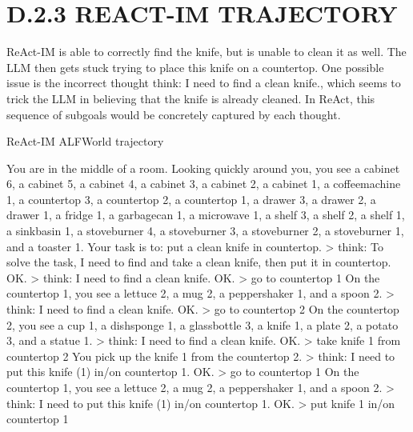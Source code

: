 \documentclass[
]{article}
\newenvironment{Shaded}{}{}
\newcommand{\NormalTok}[1]{#1}
\begin{document}
\section{D.2.3 REACT-IM TRAJECTORY}\label{d.2.3-react-im-trajectory}

ReAct-IM is able to correctly find the knife, but is unable to clean it
as well. The LLM then gets stuck trying to place this knife on a
countertop. One possible issue is the incorrect thought think: I need to
find a clean knife., which seems to trick the LLM in believing that the
knife is already cleaned. In ReAct, this sequence of subgoals would be
concretely captured by each thought.

ReAct-IM ALFWorld trajectory

\begin{Shaded}
\begin{Highlighting}[]
\NormalTok{You are in the middle of a room. Looking quickly around you, you see a cabinet 6, a cabinet 5, a cabinet 4, a cabinet 3, a cabinet 2, a cabinet 1, a coffeemachine 1, a countertop 3, a countertop 2, a countertop 1, a drawer 3, a drawer 2, a drawer 1, a fridge 1, a garbagecan 1, a microwave 1, a shelf 3, a shelf 2, a shelf 1, a sinkbasin 1, a stoveburner 4, a stoveburner 3, a stoveburner 2, a stoveburner 1, and a toaster 1.}
\NormalTok{Your task is to: put a clean knife in countertop.}
\NormalTok{\textgreater{} think: To solve the task, I need to find and take a clean knife, then put it in countertop.}
\NormalTok{OK.}
\NormalTok{\textgreater{} think: I need to find a clean knife.}
\NormalTok{OK.}
\NormalTok{\textgreater{} go to countertop 1}
\NormalTok{On the countertop 1, you see a lettuce 2, a mug 2, a peppershaker 1, and a spoon 2.}
\NormalTok{\textgreater{} think: I need to find a clean knife.}
\NormalTok{OK.}
\NormalTok{\textgreater{} go to countertop 2}
\NormalTok{On the countertop 2, you see a cup 1, a dishsponge 1, a glassbottle 3, a knife 1, a plate 2, a potato 3, and a statue 1.}
\NormalTok{\textgreater{} think: I need to find a clean knife.}
\NormalTok{OK.}
\NormalTok{\textgreater{} take knife 1 from countertop 2}
\NormalTok{You pick up the knife 1 from the countertop 2.}
\NormalTok{\textgreater{} think: I need to put this knife (1) in/on countertop 1.}
\NormalTok{OK.}
\NormalTok{\textgreater{} go to countertop 1}
\NormalTok{On the countertop 1, you see a lettuce 2, a mug 2, a peppershaker 1, and a spoon 2.}
\NormalTok{\textgreater{} think: I need to put this knife (1) in/on countertop 1.}
\NormalTok{OK.}
\NormalTok{\textgreater{} put knife 1 in/on countertop 1}

\end{Highlighting}
\end{Shaded}
\end{document}
